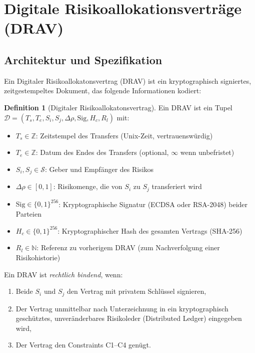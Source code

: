 \documentclass[a4paper, 12pt, twoside, openright]{report}
\theoremstyle{definition}
\newtheorem{definition}[theorem]{Definition}
\theoremstyle{definition}
\begin{document}
\section{Digitale Risikoallokationsverträge (DRAV)}

\subsection{Architektur und Spezifikation}

Ein Digitaler Risikoallokatonsvertrag (DRAV) ist ein kryptographisch signiertes, zeitgestempeltes Dokument, das folgende Informationen kodiert:

\begin{definition}[Digitaler Risikoallokatonsvertrag]
Ein DRAV ist ein Tupel $\mathcal{D} = (T_s, T_e, S_i, S_j, \Delta\rho, \text{Sig}, H_c, R_l)$ mit:
\begin{itemize}
    \item $T_s \in \mathbb{Z}$: Zeitstempel des Transfers (Unix-Zeit, vertrauenswürdig)
    \item $T_e \in \mathbb{Z}$: Datum des Endes des Transfers (optional, $\infty$ wenn unbefristet)
    \item $S_i, S_j \in \mathcal{S}$: Geber und Empfänger des Risikos
    \item $\Delta\rho \in [0,1]$: Risikomenge, die von $S_i$ zu $S_j$ transferiert wird
    \item $\text{Sig} \in \{0,1\}^{256}$: Kryptographische Signatur (ECDSA oder RSA-2048) beider Parteien
    \item $H_c \in \{0,1\}^{256}$: Kryptographischer Hash des gesamten Vertrags (SHA-256)
    \item $R_l \in \mathbb{N}$: Referenz zu vorherigem DRAV (zum Nachverfolgung einer Risikohistorie)
\end{itemize}
\end{definition}

Ein DRAV ist \emph{rechtlich bindend}, wenn:
\begin{enumerate}
    \item Beide $S_i$ und $S_j$ den Vertrag mit privatem Schlüssel signieren,
    \item Der Vertrag unmittelbar nach Unterzeichnung in ein kryptographisch geschütztes, unveränderbares Risikoleder (Distributed Ledger) eingegeben wird,
    \item Der Vertrag den Constraints C1--C4 genügt.
\end{enumerate}
\end{document}

